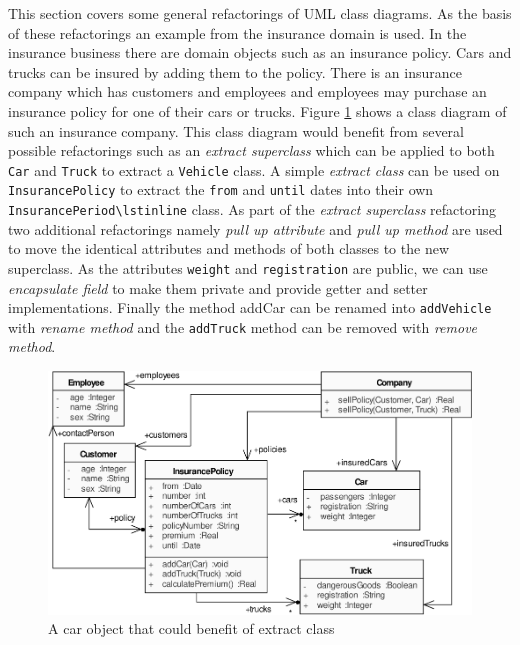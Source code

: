 \documentclass{llncs}
\begin{document}
This section covers some general refactorings of UML class diagrams. As the basis of these refactorings an example from the insurance
domain is used. In the insurance business there are domain objects such as an insurance policy. Cars and trucks can be insured by 
adding them to the policy. There is an insurance company which has customers and employees and employees may purchase an insurance policy 
for one of their cars or trucks. Figure \ref{fig:classdiagramcomplex} shows a class diagram of such an insurance company. This class 
diagram would benefit from several possible refactorings such as an \textit{extract superclass} which can be applied to both \lstinline|Car| 
and \lstinline|Truck| to extract a \lstinline|Vehicle| class. A simple \textit{extract class} can be used on \lstinline|InsurancePolicy| to 
extract the \lstinline|from| and \lstinline|until| dates into their own \lstinline|InsurancePeriod\lstinline| class. As part of the 
\textit{extract superclass} refactoring two additional refactorings namely \textit{pull up attribute} and \textit{pull up method} are 
used to move the identical attributes and methods of both classes to the new superclass. As the 
attributes \lstinline|weight| and \lstinline|registration| are public, we can use \textit{encapsulate field} to make them private and 
provide getter and setter implementations. Finally the method addCar can be renamed into \lstinline|addVehicle| with \textit{rename method} 
and the \lstinline|addTruck| method can be removed with \textit{remove method}.

\begin{figure}[h!t]
 \centering
 \includegraphics[scale=0.7]{images/ClassDiagramComplex.pdf}
 \caption{A car object that could benefit of extract class}
 \label{fig:classdiagramcomplex}
\end{figure}
\end{document}
